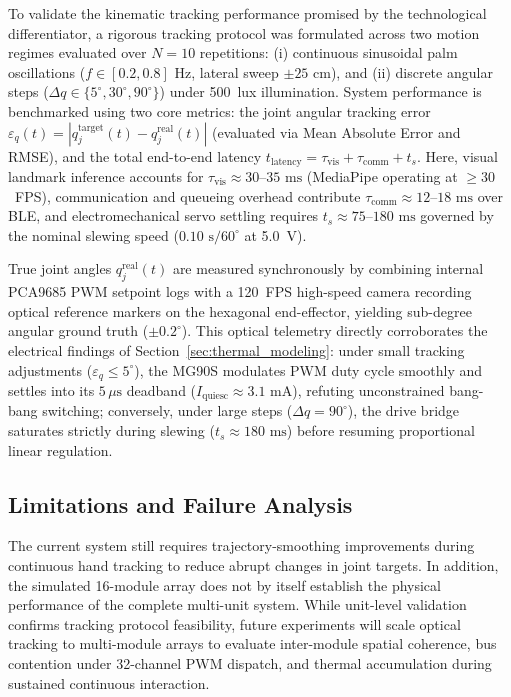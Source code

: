 \documentclass[lettersize,journal]{IEEEtran}
\begin{document}
	To validate the kinematic tracking performance promised by the
	technological differentiator, a rigorous tracking protocol was
	formulated across two motion regimes evaluated over $N = 10$ repetitions:
	(i) continuous sinusoidal palm oscillations ($f \in [0.2, 0.8]\text{ Hz}$,
	lateral sweep $\pm 25\text{ cm}$), and (ii) discrete angular steps
	($\Delta q \in \{5^\circ, 30^\circ, 90^\circ\}$) under 500~lux illumination.
	System performance is benchmarked using two core metrics:
	the joint angular tracking error $\varepsilon_q(t) = |q_j^{\text{target}}(t) - q_j^{\text{real}}(t)|$
	(evaluated via Mean Absolute Error and RMSE), and the total end-to-end
	latency $t_{\text{latency}} = \tau_{\text{vis}} + \tau_{\text{comm}} + t_s$.
	Here, visual landmark inference accounts for $\tau_{\text{vis}} \approx 30\text{--}35\text{ ms}$
	(MediaPipe operating at $\ge 30$~FPS), communication and queueing overhead
	contribute $\tau_{\text{comm}} \approx 12\text{--}18\text{ ms}$ over BLE, and
	electromechanical servo settling requires $t_s \approx 75\text{--}180\text{ ms}$
	governed by the nominal slewing speed ($0.10\text{ s}/60^\circ$ at 5.0~V).
	
	True joint angles $q_j^{\text{real}}(t)$ are measured synchronously by
	combining internal PCA9685 PWM setpoint logs with a 120~FPS high-speed
	camera recording optical reference markers on the hexagonal end-effector,
	yielding sub-degree angular ground truth ($\pm 0.2^\circ$). This optical
	telemetry directly corroborates the electrical findings of Section~\ref{sec:thermal_modeling}:
	under small tracking adjustments ($\varepsilon_q \le 5^\circ$), the MG90S
	modulates PWM duty cycle smoothly and settles into its $5\,\mu\text{s}$ deadband
	($I_{\text{quiesc}} \approx 3.1\text{ mA}$), refuting unconstrained bang-bang
	switching; conversely, under large steps ($\Delta q = 90^\circ$), the drive bridge
	saturates strictly during slewing ($t_s \approx 180\text{ ms}$) before resuming
	proportional linear regulation.
	
	\subsection{Limitations and Failure Analysis}
	\label{sec:limitations}
	
	The current system still requires trajectory-smoothing improvements
	during continuous hand tracking to reduce abrupt changes in joint
	targets. In addition, the simulated 16-module array does not by
	itself establish the physical performance of the complete multi-unit system.
	While unit-level validation confirms tracking protocol feasibility,
	future experiments will scale optical tracking to multi-module arrays to
	evaluate inter-module spatial coherence, bus contention under 32-channel PWM
	dispatch, and thermal accumulation during sustained continuous interaction.
	
\end{document}
